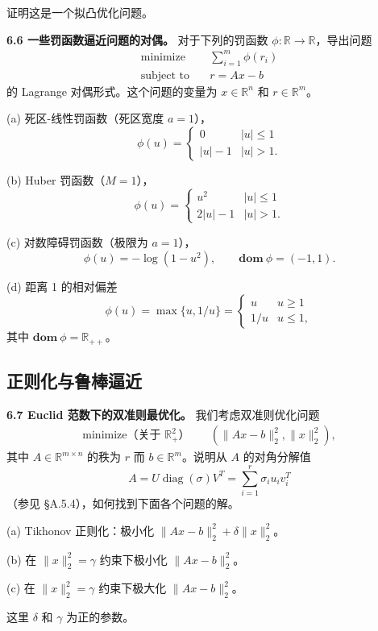 \documentclass[UTF8, 12pt, fontset=fandol, oneside]{ctexart}
\begin{document}
证明这是一个拟凸优化问题。

\noindent\textbf{6.6 一些罚函数逼近问题的对偶。}\quad
对于下列的罚函数 $\phi:\mathbb{R}\to\mathbb{R}$，导出问题
\[
\begin{aligned}
\text{minimize}\quad & \sum_{i=1}^m \phi(r_i)\\
\text{subject to}\quad & r=Ax-b
\end{aligned}
\]
的 Lagrange 对偶形式。这个问题的变量为 $x\in\mathbb{R}^n$ 和 $r\in\mathbb{R}^m$。

(a) 死区-线性罚函数（死区宽度 $a=1$），
\[
\phi(u)=
\begin{cases}
0 & |u|\leq 1\\
|u|-1 & |u|>1.
\end{cases}
\]

(b) Huber 罚函数（$M=1$），
\[
\phi(u)=
\begin{cases}
u^2 & |u|\leq 1\\
2|u|-1 & |u|>1.
\end{cases}
\]

(c) 对数障碍罚函数（极限为 $a=1$），
\[
\phi(u)=-\log(1-u^2),\qquad \mathbf{dom}\ \phi=(-1,1).
\]

(d) 距离 1 的相对偏差
\[
\phi(u)=\max\{u,1/u\}=
\begin{cases}
u & u\geq 1\\
1/u & u\leq 1,
\end{cases}
\]
其中 $\mathbf{dom}\ \phi=\mathbb{R}_{++}$。

\subsection*{正则化与鲁棒逼近}

\noindent\textbf{6.7 Euclid 范数下的双准则最优化。}\quad
我们考虑双准则优化问题
\[
\begin{aligned}
\text{minimize（关于 $\mathbb{R}_+^2$）}\quad & (\|Ax-b\|_2^2,\|x\|_2^2),
\end{aligned}
\]
其中 $A\in\mathbb{R}^{m\times n}$ 的秩为 $r$ 而 $b\in\mathbb{R}^m$。说明从 $A$ 的对角分解值
\[
A=U\operatorname{diag}(\sigma)V^T=\sum_{i=1}^r\sigma_i u_i v_i^T
\]
（参见 \S A.5.4），如何找到下面各个问题的解。

(a) Tikhonov 正则化：极小化 $\|Ax-b\|_2^2+\delta\|x\|_2^2$。

(b) 在 $\|x\|_2^2=\gamma$ 约束下极小化 $\|Ax-b\|_2^2$。

(c) 在 $\|x\|_2^2=\gamma$ 约束下极大化 $\|Ax-b\|_2^2$。

这里 $\delta$ 和 $\gamma$ 为正的参数。
\end{document}
